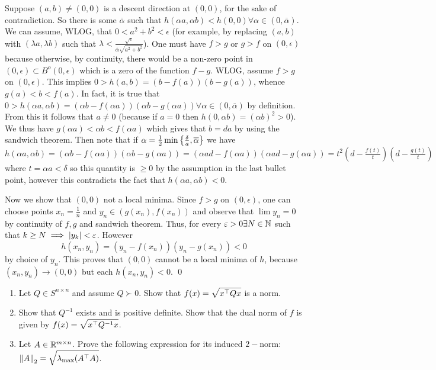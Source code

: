 \begin{pf}
Suppose $(a,b)\neq(0,0)$ is a descent direction at $(0,0)$, for the sake of contradiction. So there is some $\overline\alpha$ such that $h(\alpha a,\alpha b) < h(0,0) \forall \alpha\in(0,\overline\alpha)$. We can assume, WLOG, that $0<a^2+b^2<\epsilon$ (for example, by replacing $(a,b)$ with $(\lambda a, \lambda b)$ such that $\lambda<\frac{\sqrt\epsilon}{\overline \alpha\sqrt{a^2+b^2}}$). One must have $f>g$ or $g>f$ on $(0,\epsilon)$ because otherwise, by continuity, there would be a non-zero point in $(0,\epsilon)\subset B^o(0,\epsilon)$ which is a zero of the function $f-g$. WLOG, assume $f>g$ on $(0,\epsilon)$. This implies $0 > h(a,b) = (b-f(a))(b-g(a))$, whence $g(a) < b < f(a)$. In fact, it is true that $0>h(\alpha a, \alpha b) = (\alpha b-f(\alpha a))(\alpha b-g(\alpha a))\forall \alpha\in (0,\overline \alpha)$ by definition. From this it follows that $a\neq 0$ (because if $a=0$ then $h(0,\alpha b) = (\alpha b)^2 > 0$). We thus have $g(\alpha a)<\alpha b < f(\alpha a)$ which gives that $b = da$ by using the sandwich theorem. Then note that if $\alpha = \frac{1}{2}\min\left\{\frac{\delta}{a},\overline \alpha\right\}$ we have $h(\alpha a, \alpha b) = (\alpha b-f(\alpha a))(\alpha b - g(\alpha a)) = (\alpha ad-f(\alpha a))(\alpha ad - g(\alpha a)) = t^2 \left(d-\frac{f(t)}{t}\right) \left(d-\frac{g(t)}{t}\right)$ where $t = \alpha a < \delta$ so this quantity is $\ge0$ by the assumption in the last bullet point, however this contradicts the fact that $h(\alpha a, \alpha b) < 0$.

Now we show that $(0,0)$ not a local minima. Since $f>g$ on $(0,\epsilon)$, one can choose points $x_n=\frac{1}{n}$ and $y_n\in (g(x_n),f(x_n))$ and observe that $\lim y_n = 0$ by continuity of $f,g$ and sandwich theorem. Thus, for every $\varepsilon>0\exists N\in \mathbb{N}$ such that $k\geq N\implies \left| y_k \right| < \varepsilon$. However $$h(x_n,y_n) = (y_n-f(x_n))(y_n-g(x_n)) < 0$$ by choice of $y_n$. This proves that $(0,0)$ cannot be a local minima of $h$, because $(x_n,y_n)\to (0,0)$ but each $h(x_n,y_n)<0$.
\qed\end{pf}





\newpage
\pb
\begin{enumerate}[leftmargin=*]
\item Let $Q\in S^{n\times n}$ and assume $Q\succ 0$. Show that $\displaystyle f(x) = \sqrt{x^\top Qx}$ is a norm.
\item Show that $Q^{-1}$ exists and is positive definite. Show that the dual norm of $f$ is given by $\displaystyle f(x) = \sqrt{x^\top Q^{-1}x}$.
\item Let $A \in\mathbb{R}^{m\times n}$. Prove the following expression for its induced $2-$norm: $\displaystyle\left\lVert A \right\rVert_{2} = \sqrt{\lambda_{\max}(A^\top A)}$.
\end{enumerate}

